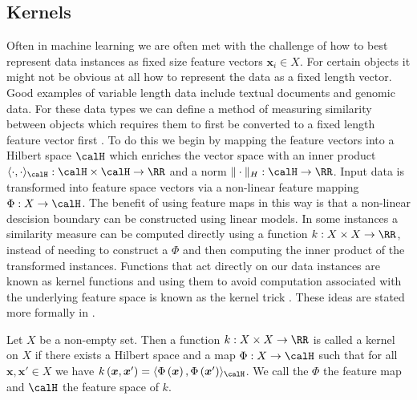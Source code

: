 \subsection*{Kernels}\label{Section1.1}

Often in machine learning we are often met with the challenge of how to best represent data instances as fixed size feature vectors $\bm{x}_i \in X$. For certain objects it might not be obvious at all how to represent the data as a fixed length vector. Good examples of variable length data include textual documents and genomic data. For these data types we can define a method of measuring similarity between objects which requires them to first be converted to a fixed length feature vector first \cite{MurphyKevinP2012Ml}. To do this we begin by mapping the feature vectors into a Hilbert space $\calH$ which enriches the vector space with an inner product $\langle \cdot , \cdot \rangle_{\calH} : \calH \times \calH \to \RR$ and a norm $\| \cdot \|_H : \calH \to \RR$. Input data is transformed into feature space vectors via a non-linear feature mapping $\Phi : X \to \calH$. The benefit of using feature maps in this way is that a non-linear descision boundary can be constructed using linear models. In some instances a similarity measure can be computed directly using a function $k : X \times X \to \RR$, instead of needing to construct a $\Phi$ and then computing the inner product of the transformed instances. Functions that act directly on our data instances are known as kernel functions and using them to avoid computation associated with the underlying feature space is known as the kernel trick \cite{SteinwartIngo2008SVMb}. These ideas are stated more formally in .

\begin{defe}[Kernel] \label{defe: kernel}
    Let $X$ be a non-empty set. Then a function $k : X \times X \to \RR$ is called a kernel on $X$ if there exists a Hilbert space and a map $\Phi : X \to \calH$ such that for all $\bm{x} , \bm{x}' \in X$ we have $k \left( \bm{x} , \bm{x}' \right) = \langle \Phi \left( \bm{x} \right), \Phi \left( \bm{x}' \right) \rangle_{\calH}$. We call the $\Phi$ the feature map and $\calH$ the feature space of $k$.
\end{defe}

